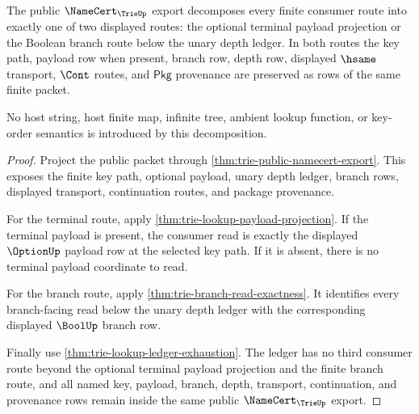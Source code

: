 \begin{theorem}\label{thm:trie-public-export-route-decomposition}
The public $\NameCert_{\TrieUp}$ export decomposes every finite consumer route
into exactly one of two displayed routes: the optional terminal payload
projection or the Boolean branch route below the unary depth ledger. In both
routes the key path, payload row when present, branch row, depth row, displayed
$\hsame$ transport, $\Cont$ routes, and $\mathsf{Pkg}$ provenance are preserved
as rows of the same finite packet.

No host string, host finite map, infinite tree, ambient lookup function, or
key-order semantics is introduced by this decomposition.
\end{theorem}
\begin{proof}
Project the public packet through
\autoref{thm:trie-public-namecert-export}. This exposes the finite key path,
optional payload, unary depth ledger, branch rows, displayed transport,
continuation routes, and package provenance.

For the terminal route, apply
\autoref{thm:trie-lookup-payload-projection}. If the terminal payload is
present, the consumer read is exactly the displayed $\OptionUp$ payload row at
the selected key path. If it is absent, there is no terminal payload coordinate
to read.

For the branch route, apply \autoref{thm:trie-branch-read-exactness}. It
identifies every branch-facing read below the unary depth ledger with the
corresponding displayed $\BoolUp$ branch row.

Finally use \autoref{thm:trie-lookup-ledger-exhaustion}. The ledger has no
third consumer route beyond the optional terminal payload projection and the
finite branch route, and all named key, payload, branch, depth, transport,
continuation, and provenance rows remain inside the same public
$\NameCert_{\TrieUp}$ export.
\end{proof}


